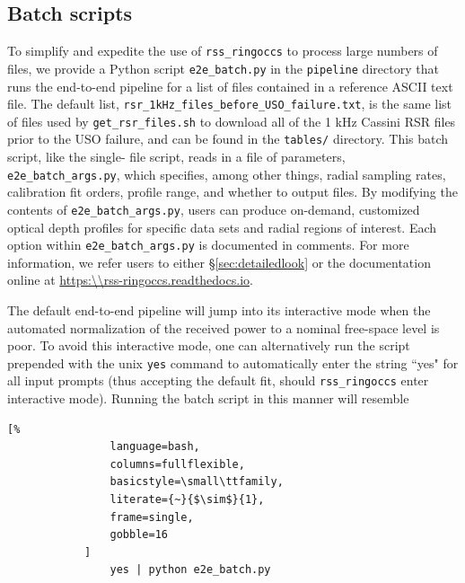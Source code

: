 \documentclass[titlepage, 12pt]{article}
\begin{document}
        \subsection{Batch scripts}\label{sec:batchrun}
            To simplify and expedite the use of \texttt{rss\_ringoccs}
            to process large numbers of files, we provide a Python
            script \texttt{e2e\_batch.py} in the \texttt{pipeline} directory that
            runs the end-to-end pipeline for a list
            of files contained in a reference ASCII text file.
            The default list,
            \texttt{rsr\_1kHz\_files\_before\_USO\_failure.txt},
            is the same list of files used by \texttt{get\_rsr\_files.sh}
            to download all of the 1 kHz Cassini RSR files prior to
            the USO failure, and can be found in the
            \texttt{tables/} directory. This batch script, like the single-
            file script, reads in a file of parameters, 
            \texttt{e2e\_batch\_args.py}, which specifies, among
            other things, radial sampling rates, calibration fit orders, 
            profile range, and whether to output files.
            By modifying the contents of
            \texttt{e2e\_batch\_args.py}, users can produce
            on-demand, customized optical depth profiles for specific data sets and radial regions of interest.
            Each option within \texttt{e2e\_batch\_args.py} is documented
            in comments. For more information, we refer users to either \S\ref{sec:detailedlook} or the documentation online at 
            \url{https:\\rss-ringoccs.readthedocs.io}.
            \par\hfill\par
            The default end-to-end pipeline will jump into its interactive
            mode when the automated normalization of the received power to a nominal free-space level 
            is poor. To avoid this
            interactive mode, one can alternatively run the script prepended with
            the unix \texttt{yes} command to automatically enter the string
            ``yes" for all input prompts (thus accepting the default fit,
            should \texttt{rss\_ringoccs} enter interactive mode). Running
            the batch script in this manner will resemble
            \begin{lstlisting}[%
                language=bash,
                columns=fullflexible,
                basicstyle=\small\ttfamily,
                literate={~}{$\sim$}{1},
                frame=single,
                gobble=16
            ]
                yes | python e2e_batch.py
            \end{lstlisting}
\end{document}
